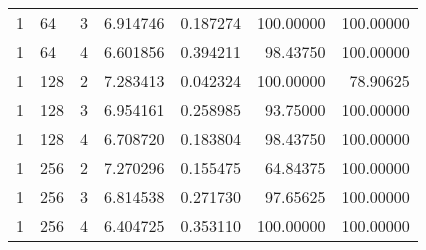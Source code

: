 \begin{tabular}{lllrrrr}
              1 &    64 &            3 & 6.914746 & 0.187274 & 100.00000 & 100.00000 \\
              1 &    64 &            4 & 6.601856 & 0.394211 &  98.43750 & 100.00000 \\
              1 &   128 &            2 & 7.283413 & 0.042324 & 100.00000 &  78.90625 \\
              1 &   128 &            3 & 6.954161 & 0.258985 &  93.75000 & 100.00000 \\
              1 &   128 &            4 & 6.708720 & 0.183804 &  98.43750 & 100.00000 \\
              1 &   256 &            2 & 7.270296 & 0.155475 &  64.84375 & 100.00000 \\
              1 &   256 &            3 & 6.814538 & 0.271730 &  97.65625 & 100.00000 \\
              1 &   256 &            4 & 6.404725 & 0.353110 & 100.00000 & 100.00000 \\
\bottomrule
\end{tabular}
